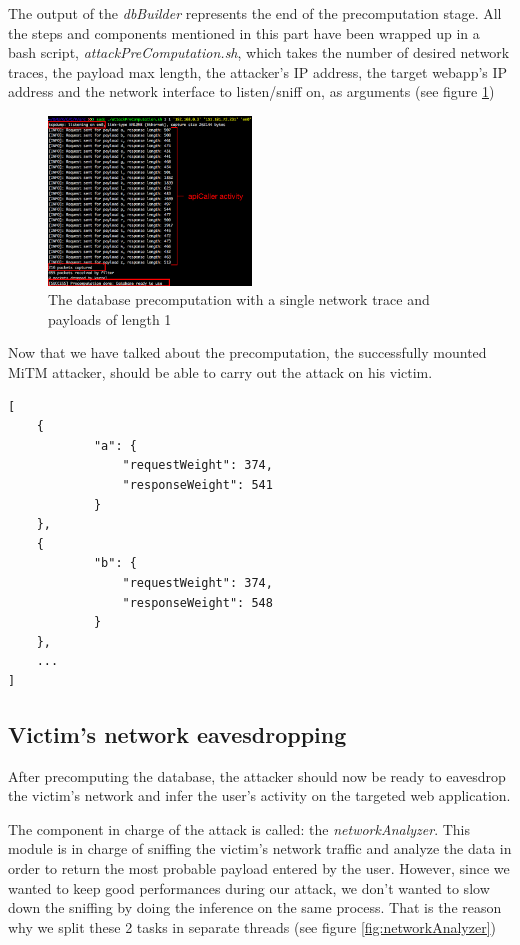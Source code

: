 \documentclass[journal]{IEEEtran}
\begin{document}
The output of the \emph{dbBuilder} represents the end of the precomputation stage. All the steps and components mentioned in this part have been wrapped up in a bash script, \emph{attackPreComputation.sh}, which takes the number of desired network traces, the payload max length, the attacker's IP address, the target webapp's IP address and the network interface to listen/sniff on, as arguments (see figure \ref{fig:dbBuilding})

\begin{figure}[h]
\centering
\includegraphics[width=0.48\textwidth]{images/dbBuilding.png}
\caption{The database precomputation with a single network trace and payloads of length 1}
\label{fig:dbBuilding}
\end{figure}

Now that we have talked about the precomputation, the successfully mounted MiTM attacker, should be able to carry out the attack on his victim.

\begin{lstlisting}[caption=The JSON structure of the precomputed database, label={listing:databaseStructure}]
[
	{
			"a": {
				"requestWeight": 374,
				"responseWeight": 541
			}
	},
	{
			"b": {
				"requestWeight": 374,
				"responseWeight": 548
			}
	},
    ...
]
\end{lstlisting}

\subsection{Victim's network eavesdropping}

After precomputing the database, the attacker should now be ready to eavesdrop the victim's network and infer the user's activity on the targeted web application.

\medskip

The component in charge of the attack is called: the \emph{networkAnalyzer}. This module is in charge of sniffing the victim's network traffic and analyze the data in order to return the most probable payload entered by the user. However, since we wanted to keep good performances during our attack, we don't wanted to slow down the sniffing by doing the inference on the same process. That is the reason why we split these 2 tasks in separate threads (see figure \ref{fig:networkAnalyzer})
\end{document}
